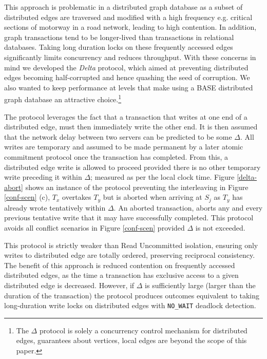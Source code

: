 \documentclass[sigplan,10pt]{acmart}
\begin{document}
This approach is problematic in a distributed graph database as a subset of distributed edges are traversed and modified with a high frequency e.g. critical sections of motorway in a road network, leading to high contention. In addition, graph transactions tend to be longer-lived than transactions in relational databases. Taking long duration locks on these frequently accessed edges significantly limits concurrency and reduces throughput. With these concerns in mind we developed the \emph{Delta} protocol, which aimed at preventing distributed edges becoming half-corrupted and hence quashing the seed of corruption. We also wanted to keep performance at levels that make using a BASE distributed graph database an attractive choice.\footnote{The $\Delta$ protocol is solely a concurrency control mechanism for distributed edges, guarantees about vertices, local edges are beyond the scope of this paper.}

The protocol leverages the fact that a transaction that writes at one end of a distributed edge, must then immediately write the other end. It is then assumed that the network delay between two servers can be predicted to be some $\Delta$. All writes are temporary and assumed to be made permanent by a later atomic commitment protocol once the transaction has completed. From this, a distributed edge write is allowed to proceed provided there is no other temporary write preceding it within $\Delta$; measured as per the local clock time. Figure \ref{delta-abort} shows an instance of the protocol preventing the interleaving in Figure \ref{conf-scen} (c), $T_x$ overtakes $T_y$ but is aborted when arriving at $S_j$ as $T_y$ has already wrote tentatively within $\Delta$. An aborted transaction, aborts any and every previous tentative write that it may have successfully completed. This protocol avoids all conflict scenarios in Figure \ref{conf-scen} provided $\Delta$ is not exceeded.

This protocol is strictly weaker than Read Uncommitted isolation, ensuring only writes to distributed edge are totally ordered, preserving reciprocal consistency. The benefit of this approach is reduced contention on frequently accessed distributed edges, as the time a transaction has exclusive access to a given distributed edge is decreased. However, if $\Delta$ is sufficiently large (larger than the duration of the transaction) the protocol produces outcomes equivalent to taking long-duration write locks on distributed edges with \texttt{NO_WAIT} deadlock detection.
\end{document}
